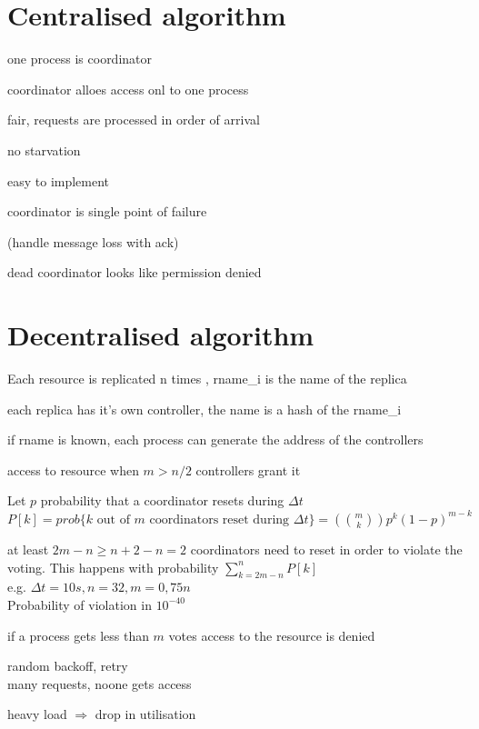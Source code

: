 \documentclass[ngerman,a4paper]{report}
\begin{document}
\section{Centralised algorithm}
\begin{compactitem}
	\item one process is coordinator
	\item coordinator alloes access onl to one process
	\item fair, requests are processed in order of arrival
	\item no starvation
	\item easy to implement
	\item coordinator is single point of failure
	\item (handle message loss with ack)
	\item dead coordinator looks like permission denied
\end{compactitem}
\section{Decentralised algorithm}
\begin{compactitem}
	\item Each resource is replicated n times , rname\_i is the name of the replica\\
	\item each replica has it's own controller, the name is a hash of the rname\_i
	\item if rname is known, each process can generate the address of the controllers				
	\item access to resource when $m>n/2$ controllers grant it
	\item Let $p$ probability that a coordinator resets during $\Delta t$\\
		$P[k]= prob\lbrace k \text{ out of } m \text{ coordinators reset during } \Delta t\rbrace = \left( \binom{m}{k}\right) p^k (1-p)^{m-k}$
	\item at least $2m-n\geq n+2-n=2$ coordinators need to reset in order to violate the voting. This happens with probability $\sum\limits_{k=2m-n}^n P[k]$\\
		e.g. $\Delta t = 10s, n=32, m=0,75n$\\
		Probability of violation in $10^{-40}$
	\item if a process gets less than $m$ votes access to the resource is denied
	\item random backoff, retry\\
		many requests, noone gets access
	\item heavy load $\Rightarrow$ drop in utilisation
\end{compactitem}
\end{document}
